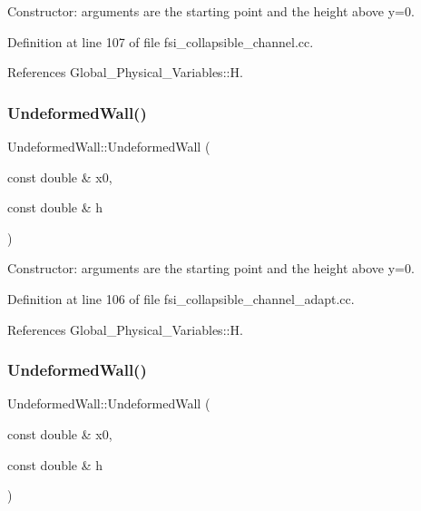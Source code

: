 Constructor\+: arguments are the starting point and the height above y=0. 



Definition at line 107 of file fsi\+\_\+collapsible\+\_\+channel.\+cc.



References Global\+\_\+\+Physical\+\_\+\+Variables\+::H.

\mbox{\label{classUndeformedWall_ad09cfdcd234be0ab47eb97a8a470602a}} 
\subsubsection{\texorpdfstring{Undeformed\+Wall()}{UndeformedWall()}\hspace{0.1cm}{\footnotesize\ttfamily [2/4]}}
{\footnotesize\ttfamily Undeformed\+Wall\+::\+Undeformed\+Wall (\begin{DoxyParamCaption}\item[{const double \&}]{x0,  }\item[{const double \&}]{h }\end{DoxyParamCaption})\hspace{0.3cm}{\ttfamily [inline]}}



Constructor\+: arguments are the starting point and the height above y=0. 



Definition at line 106 of file fsi\+\_\+collapsible\+\_\+channel\+\_\+adapt.\+cc.



References Global\+\_\+\+Physical\+\_\+\+Variables\+::H.

\mbox{\label{classUndeformedWall_ad09cfdcd234be0ab47eb97a8a470602a}} 
\subsubsection{\texorpdfstring{Undeformed\+Wall()}{UndeformedWall()}\hspace{0.1cm}{\footnotesize\ttfamily [3/4]}}
{\footnotesize\ttfamily Undeformed\+Wall\+::\+Undeformed\+Wall (\begin{DoxyParamCaption}\item[{const double \&}]{x0,  }\item[{const double \&}]{h }\end{DoxyParamCaption})\hspace{0.3cm}{\ttfamily [inline]}}



